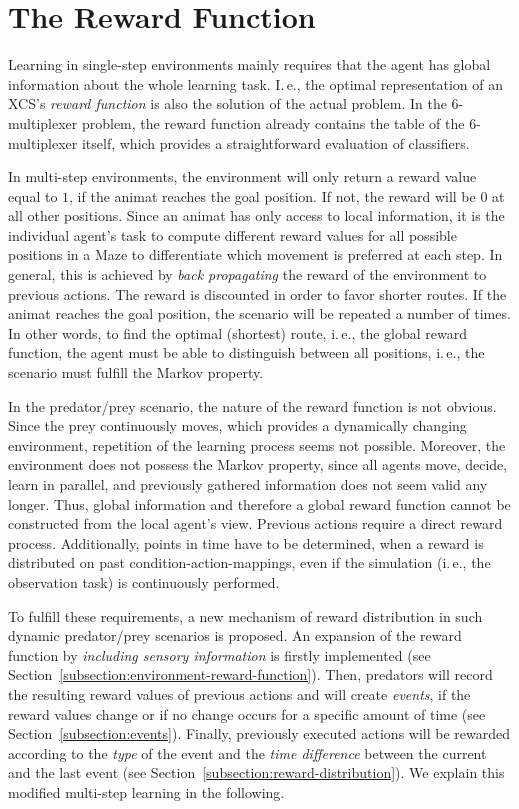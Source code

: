\section{The Reward Function}
\label{section:the-reward-function}

Learning in single-step environments mainly requires that the agent has global information about the whole learning task. I.\,e., the optimal representation of an XCS's \emph{reward function} is also the solution of the actual problem. In the 6-multiplexer problem, the reward function already contains the table of the 6-multiplexer itself, which provides a straightforward evaluation of classifiers.

In multi-step environments, the environment will only return a reward value equal to $1$, if the animat reaches the goal position. If not, the reward will be $0$ at all other positions. Since an animat has only access to local information, it is the individual agent's task to compute different reward values for all possible positions in a Maze to differentiate which movement is preferred at each step. In general, this is achieved by \emph{back propagating} the reward of the environment to previous actions. The reward is discounted in order to favor shorter routes. If the animat reaches the goal position, the scenario will be repeated a number of times. In other words, to find the optimal (shortest) route, i.\,e., the global reward function, the agent must be able to distinguish between all positions, i.\,e., the scenario must fulfill the Markov property.

In the predator/prey scenario, the nature of the reward function is not obvious. Since the prey continuously moves, which provides a dynamically changing environment, repetition of the learning process seems not possible. Moreover, the environment does not possess the Markov property, since all agents move, decide, learn in parallel, and previously gathered information does not seem valid any longer. Thus, global information and therefore a global reward function cannot be constructed from the local agent's view. Previous actions require a direct reward process. Additionally, points in time have to be determined, when a reward is distributed on past condition-action-mappings, even if the simulation (i.\,e., the observation task) is continuously performed.

To fulfill these requirements, a new mechanism of reward distribution in such dynamic predator/prey scenarios is proposed. An expansion of the reward function by \emph{in\-clud\-ing sensory information} is firstly implemented %
(see Section~\ref{subsection:environment-reward-function}). Then, predators will record the resulting reward values of previous actions and will create \emph{events}, if the reward values change or if no change occurs for a specific amount of time (see Section~\ref{subsection:events}). Finally, previously executed actions will be rewarded according to the \emph{type} of the event and the \emph{time difference} between the current and the last event (see Section~\ref{subsection:reward-distribution}). We explain this modified multi-step learning in the following.

